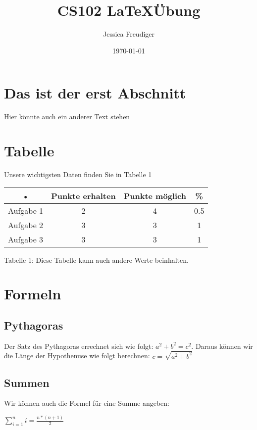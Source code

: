 \documentclass{article}
\title{CS102 \LaTeX \"Ubung}
\date{\today}
\author{Jessica Freudiger}
\begin{document}
\maketitle
\section{Das ist der erst Abschnitt}
Hier könnte auch ein anderer Text stehen
\section{Tabelle}
Unsere wichtigsten Daten finden Sie in Tabelle 1
\begin{center}
\begin{tabular}{c|c|c|c}
  • & Punkte erhalten & Punkte m\"oglich & \% \\ 
  \hline
 Aufgabe 1 & 2 & 4 & 0.5 \\  
 Aufgabe 2 & 3 & 3 & 1 \\ 
 Aufgabe 3 & 3 & 3 & 1 \\  
 \end{tabular} 

Tabelle 1: Diese Tabelle kann auch andere Werte beinhalten.
\end{center}
\section{Formeln}
\subsection{Pythagoras}
Der Satz des Pythagoras errechnet sich wie folgt: $a^2+b^2=c^2$. Daraus können wir die Länge der Hypothenuse wie folgt berechnen: $c=\sqrt{a^2+b^2}$
\subsection{Summen}
Wir können auch die Formel für eine Summe angeben:
\begin{center}
$\sum\limits_{i=1}^{n} i=\frac{n*(n+1)}{2}$ 
\end{center}
\end{document}
